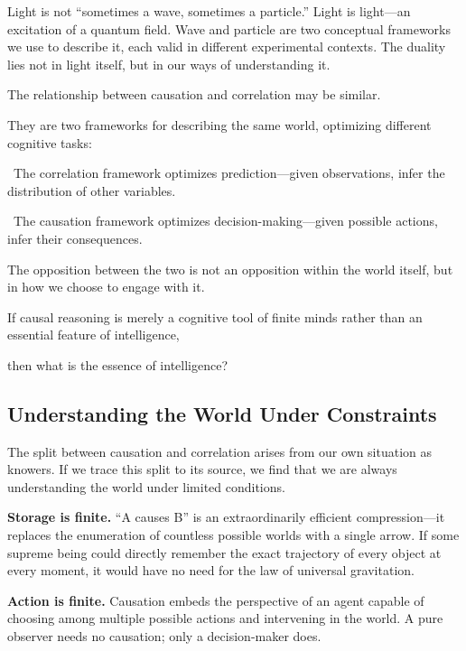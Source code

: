 Light is not ``sometimes a wave, sometimes a particle.'' Light is light---an excitation of a quantum field. Wave and particle are two conceptual frameworks we use to describe it, each valid in different experimental contexts. The duality lies not in light itself, but in our ways of understanding it.

\vspace{0.8em}

The relationship between causation and correlation may be similar.

They are two frameworks for describing the same world, optimizing different cognitive tasks:

\textbullet~The correlation framework optimizes prediction---given observations, infer the distribution of other variables.

\textbullet~The causation framework optimizes decision-making---given possible actions, infer their consequences.

\vspace{0.8em}

The opposition between the two is not an opposition within the world itself, but in how we choose to engage with it.

\begin{thinkbox}[思考]
If causal reasoning is merely a cognitive tool of finite minds rather than an essential feature of intelligence,

then what is the essence of intelligence?
\end{thinkbox}

\newpage
\subsection{Understanding the World Under Constraints}

The split between causation and correlation arises from our own situation as knowers.
If we trace this split to its source, we find that we are always understanding the world under limited conditions.

\vspace{1em}

\textbf{Storage is finite.} ``A causes B'' is an extraordinarily efficient compression---it replaces the enumeration of countless possible worlds with a single arrow. If some supreme being could directly remember the exact trajectory of every object at every moment, it would have no need for the law of universal gravitation.

\textbf{Action is finite.} Causation embeds the perspective of an agent capable of choosing among multiple possible actions and intervening in the world. A pure observer needs no causation; only a decision-maker does.

